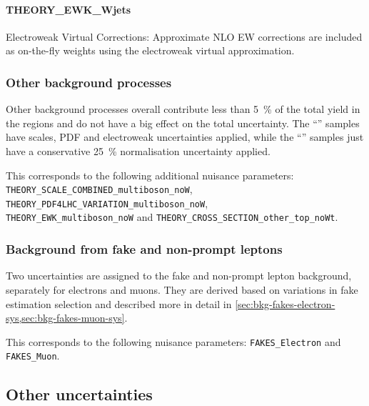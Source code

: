 \paragraph{THEORY\_EWK\_Wjets} Electroweak Virtual Corrections: Approximate NLO EW corrections are included as on-the-fly weights using the electroweak virtual approximation.


\subsubsection{Other background processes}

Other background processes overall contribute less than \qty{5}{\%} of the total
yield in the regions and do not have a big effect on the total uncertainty.
The ``\OtherV'' samples have scales, PDF and electroweak
uncertainties applied, while the ``\OtherT'' samples just have
a conservative \qty{25}{\%} normalisation uncertainty applied.

This corresponds to the following additional nuisance parameters:\\
\texttt{THEORY\_SCALE\_COMBINED\_multiboson\_noW},
\texttt{THEORY\_PDF4LHC\_VARIATION\_multiboson\_noW},\\
\texttt{THEORY\_EWK\_multiboson\_noW} and 
\texttt{THEORY\_CROSS\_SECTION\_other\_top\_noWt}.

\subsubsection{Background from fake and non-prompt leptons}%
\label{sec:Systematics_fakes}

Two uncertainties are assigned to the fake and non-prompt lepton background,
separately for electrons and muons. They are derived based on variations
in fake estimation selection and described more in detail in
\cref{sec:bkg-fakes-electron-sys,sec:bkg-fakes-muon-sys}.

This corresponds to the following nuisance parameters:
\texttt{FAKES\_Electron} and 
\texttt{FAKES\_Muon}.

\subsection{Other uncertainties}

